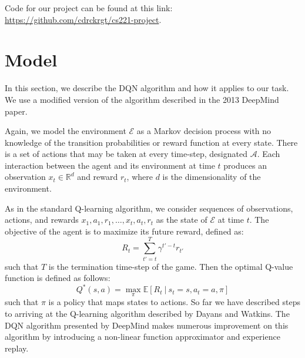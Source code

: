 \documentclass{article}
\begin{document}
Code for our project can be found at this link: \href{https://github.com/cdrckrgt/cs221-project} {https://github.com/cdrckrgt/cs221-project}.

\section{Model}

In this section, we describe the DQN algorithm and how it applies to our task. We use a modified version of the algorithm described in the 2013 DeepMind paper.

Again, we model the environment $\mathcal{E}$ as a Markov decision process with no knowledge of the transition probabilities or reward function at every state.
There is a set of actions that may be taken at every time-step, designated $\mathcal{A}$.
Each interaction between the agent and its environment at time $t$ produces an observation $x_t \in \mathbb{R}^{d}$ and reward $r_t$, where $d$ is the dimensionality of the environment.

As in the standard Q-learning algorithm, we consider sequences of observations, actions, and rewards $x_1, a_1, r_1, \dots, x_t, a_t, r_t$ as the state of $\mathcal{E}$ at time $t$. 
The objective of the agent is to maximize its future reward, defined as:
\begin{equation}
\displaystyle R_t = \sum_{t' = t}^{T} \gamma^{t' - t}r_{t'}
\end{equation}
such that $T$ is the termination time-step of the game.
Then the optimal Q-value function is defined as follows:
\begin{equation}
\displaystyle Q^{*}(s, a) = \max_{\pi}\mathbb{E}[R_t\ |\ s_t = s, a_t = a, \pi]
\end{equation}
such that $\pi$ is a policy that maps states to actions.
So far we have described steps to arriving at the Q-learning algorithm described by Dayans and Watkins. \cite{qlearning} 
The DQN algorithm presented by DeepMind makes numerous improvement on this algorithm by introducing a non-linear function approximator and experience replay.
\end{document}
